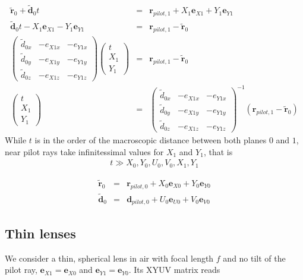 \documentclass[12pt,a4paper,twoside,openright,BCOR10mm,headsepline,titlepage,abstracton,chapterprefix,final]{scrreprt}
\newcommand\Vector[1]{{\mathbf{#1}}}
\begin{document}
\begin{eqnarray}
  \tilde{\Vector{r}}_0 + \tilde{\Vector{d}}_0 t &=& \Vector{r}_{pilot,1} + X_1 \Vector{e}_{X1} + Y_1 \Vector{e}_{Y1}
\\
  \tilde{\Vector{d}}_0 t - X_1 \Vector{e}_{X1} - Y_1 \Vector{e}_{Y1} &=& \Vector{r}_{pilot,1} - \tilde{\Vector{r}}_0  
\\
  \begin{pmatrix}
   \tilde{d}_{0x} & -e_{X1x} & -e_{Y1x}
   \\
   \tilde{d}_{0y} & -e_{X1y} & -e_{Y1y}
   \\
   \tilde{d}_{0z} & -e_{X1z} & -e_{Y1z}
  \end{pmatrix}
  \begin{pmatrix}
    t \\ X_1 \\ Y_1
  \end{pmatrix}
  &=&
  \Vector{r}_{pilot,1} - \tilde{\Vector{r}}_0
\\
  \begin{pmatrix}
    t \\ X_1 \\ Y_1
  \end{pmatrix}
  &=&
  \begin{pmatrix}
   \tilde{d}_{0x} & -e_{X1x} & -e_{Y1x}
   \\
   \tilde{d}_{0y} & -e_{X1y} & -e_{Y1y}
   \\
   \tilde{d}_{0z} & -e_{X1z} & -e_{Y1z}
  \end{pmatrix}^{-1}
  \left(
    \Vector{r}_{pilot,1} - \tilde{\Vector{r}}_0
  \right)
\end{eqnarray}
While $t$ is in the order of the macroscopic distance between both planes $0$ and $1$,
near pilot rays take infinitessimal values for $X_1$ and $Y_1$, that is 
\begin{eqnarray}
t \gg X_0, Y_0, U_0, V_0, X_1, Y_1 
\end{eqnarray}




\begin{eqnarray}
  \tilde{\Vector{r}}_0 &=& \Vector{r}_{pilot,0} + X_0 \Vector{e}_{X0} + Y_0 \Vector{e}_{Y0}
\\
  \tilde{\Vector{d}}_0 &=& \Vector{d}_{pilot,0} + U_0 \Vector{e}_{U0} + V_0 \Vector{e}_{V0}
\end{eqnarray}



\subsection{Thin lenses}
We consider a thin, spherical lens in air with focal length $f$ and no tilt of the pilot ray, 
$\Vector{e}_{X1} = \Vector{e}_{X0}$ and $\Vector{e}_{Y1} = \Vector{e}_{Y0}$. Its XYUV matrix reads
\end{document}
